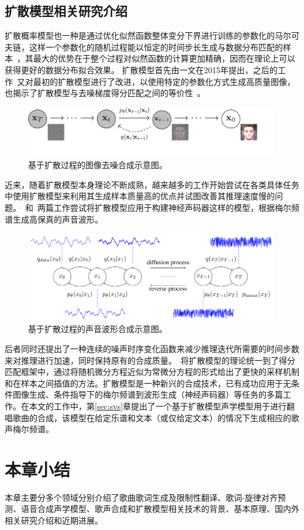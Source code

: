 \subsection{扩散模型相关研究介绍}
扩散概率模型也一种是通过优化似然函数整体变分下界进行训练的参数化的马尔可夫链，这样一个参数化的随机过程能以恒定的时间步长生成与数据分布匹配的样本~\citep{Ho2020ddpm}，其最大的优势在于整个过程对似然函数的计算更加精确，因而在理论上可以获得更好的数据分布拟合效果。
扩散模型首先由\citet{sohl2015deep}一文在2015年提出，之后的工作\citet{Ho2020ddpm}~又对最初的扩散模型进行了改进，以使用特定的参数化方式生成高质量图像，也揭示了扩散模型与去噪梯度得分匹配之间的等价性~\citep{song2019generative,song2021scorebased}。
\begin{figure}[!h]
  \includegraphics[width=0.99\textwidth]{figure/related/ddpm.pdf}
  \caption{基于扩散过程的图像去噪合成示意图\citep{Ho2020ddpm}。}
\end{figure}
近来，随着扩散模型本身理论不断成熟，越来越多的工作开始尝试在各类具体任务中使用扩散模型来利用其生成样本质量高的优点并试图改善其推理速度慢的问题。\citet{kong2021diffwave}~和\citet{chen2021wavegrad}~两篇工作尝试将扩散模型应用于构建神经声码器这样的模型，根据梅尔频谱生成高保真的声音波形。
\begin{figure}[!h]
  \includegraphics[width=0.99\textwidth]{figure/related/diffwave.png}
  \caption{基于扩散过程的声音波形合成示意图\citep{kong2021diffwave}。}
\end{figure}
后者同时还提出了一种连续的噪声时序变化函数来减少推理迭代所需要的时间步数来对推理进行加速，同时保持原有的合成质量。\citet{song2021denoising}~将扩散模型的理论统一到了得分匹配框架中，通过将随机微分方程近似为常微分方程的形式给出了更快的采样机制和在样本之间插值的方法。扩散模型是一种新兴的合成技术，已有成功应用于无条件图像生成、条件指导下的梅尔频谱到波形生成（神经声码器）等任务的多篇工作。在本文的工作中，第\ref{sec:svs}章提出了一个基于扩散模型声学模型用于进行翻唱歌曲的合成，该模型在给定乐谱和文本（或仅给定文本）的情况下生成相应的歌声梅尔频谱。
\section{本章小结}
本章主要分多个领域分别介绍了歌曲歌词生成及限制性翻译、歌词-旋律对齐预测、语音合成声学模型、歌声合成和扩散模型相关技术的背景、基本原理、国内外相关研究介绍和近期进展。
